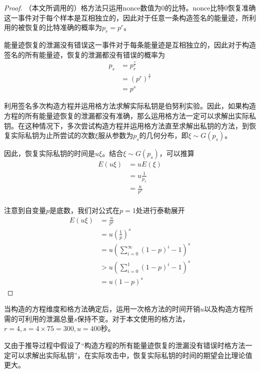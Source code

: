 {\begin{proof}
		（本文所调用的）格方法只运用nonce数值为0的比特。nonce比特0恢复准确这一事件对于每个样本是互相独立的，因此对于任意一条构造签名的能量迹，所利用的被恢复的比特准确的概率为$p_r=p^r$。
	
		能量迹恢复的泄漏没有错误这一事件对于每条能量迹是互相独立的，因此对于构造签名的所有能量迹，恢复的泄漏都没有错误的概率为\begin{align*}
			p_s&=p_r^{\frac sr}\\
			&=\left(p^r \right) ^{\frac sr}\\
			&=p^s
		\end{align*}
	
		利用签名多次构造方程并运用格方法求解实际私钥是伯努利实验。因此，如果构造方程的所有能量迹恢复的泄漏都没有准确，那么运用格方法一定可以求解出实际私钥。在这种情况下，多次尝试构造方程并运用格方法直至求解出私钥的方法，到恢复实际私钥为止所尝试的次数$\xi$服从参数为$p_s$的几何分布，即$\xi\sim G(p_s)$。
		
		因此，恢复实际私钥的时间是$u\xi$。结合$\xi\sim G(p_s)$，可以推算\begin{align*}
			E(u\xi)&=uE(\xi)\\
			&=u\frac{1}{p_s}\\
			&=\frac{u}{p^s}\\
		\end{align*}
	
		注意到自变量$p$是底数，我们对公式在$p=1$处进行泰勒展开\begin{align*}
			E(u\xi)&=\frac{u}{p^s}\\
			&=u\left( \frac1p\right) ^s\\
			&=u\left( \sum\limits_{i=0}^{\infty}\left( 1-p\right) ^i-1\right) ^s\\
			&>u\left( \sum\limits_{i=0}^{1}\left( 1-p\right) ^i-1\right) ^s\\
			&=u\left( 1-p\right) ^s
		\end{align*}

	\end{proof}
	当构造的方程维度和格方法确定后，运用一次格方法的时间开销$u$以及构造方程所需的可利用的泄漏总量$s$保持不变。对于本文使用的格方法，$r=4,s=4\times75=300,u=400$秒。%
	
	又由于推导过程中假设了“构造方程的所有能量迹恢复的泄漏没有错误时格方法一定可以求解出实际私钥”，在实际攻击中，恢复实际私钥的时间的期望会比理论值更大。
	
}
